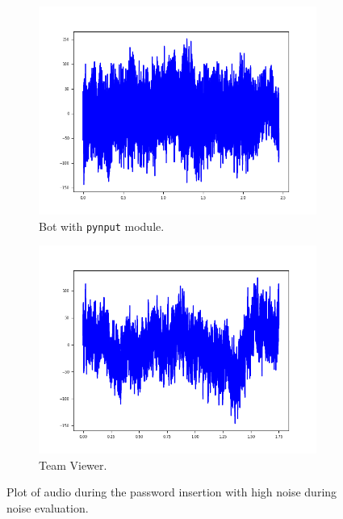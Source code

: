 \begin{figure}[h]
     \centering
	 \begin{subfigure}[b]{0.48\textwidth}
         \centering
         \includegraphics[width=\linewidth]{Images/Results/Bot/silence}
         \caption{\footnotesize{Bot with \texttt{pynput} module.}}
     \end{subfigure}
	 \hfill     
     \begin{subfigure}[b]{0.48\textwidth}
         \centering
         \includegraphics[width=\linewidth]{Images/Results/TeamViewer/silence}
         \caption{\footnotesize{Team Viewer.}}
     \end{subfigure}
     \caption{\footnotesize{Plot of audio during the password insertion with high noise during noise evaluation.}}\label{Results:silence_img}
\end{figure}
